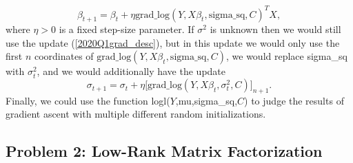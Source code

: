 \begin{enumerate}
\begin{equation}\label{2020Q1grad_desc}
\beta_{t+1} = \beta_t + \eta \text{grad\_log}(Y,X\beta_t,\text{sigma\_sq},C)^TX,
\end{equation}
where $\eta > 0$ is a fixed step-size parameter. If $\sigma^2$ is unknown then we would still use the update (\ref{2020Q1grad_desc}), but in this update we would only use the first $n$ coordinates of $\text{grad\_log}(Y,X\beta_t,\text{sigma\_sq},C)$, we would replace sigma\_sq with $\sigma^2_t$, and we would additionally have the update
\[
\sigma_{t+1} = \sigma_t + \eta \Big[ \text{grad\_log}(Y,X\beta_t,\sigma^2_t,C) \Big]_{n+1}.
\]
Finally, we could use the function logl($Y$,mu,sigma\_sq,$C$) to judge the results of gradient ascent with multiple different random initializations.
\end{enumerate}

\subsection*{Problem 2: Low-Rank Matrix Factorization}

